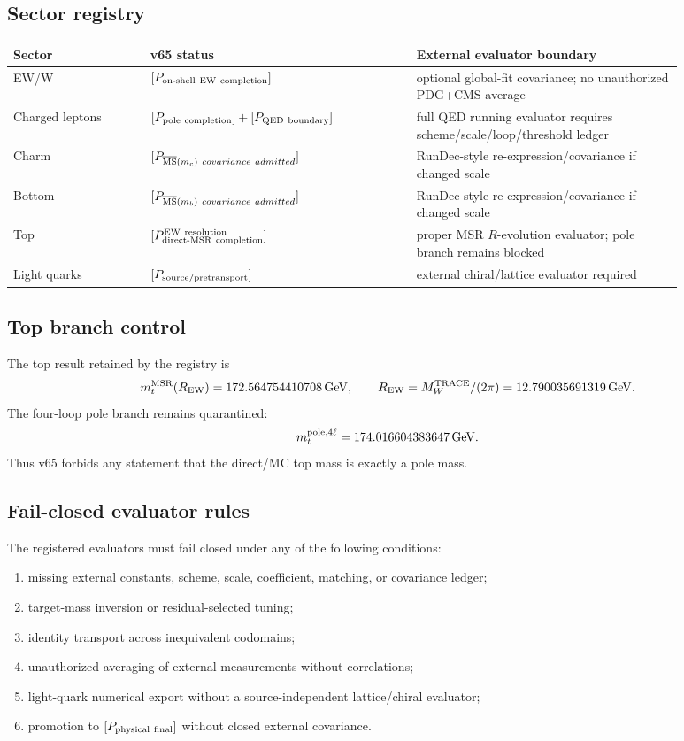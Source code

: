 \subsection{Sector registry}
\begin{center}
\begin{tabular}{p{0.18\linewidth}p{0.35\linewidth}p{0.35\linewidth}}
\hline
Sector & v65 status & External evaluator boundary\\
\hline
EW/W & $[P_{\rm on\text{-}shell\ EW\ completion}]$ & optional global-fit covariance; no unauthorized PDG+CMS average\\
Charged leptons & $[P_{\rm pole\ completion}]+[P_{\rm QED\ boundary}]$ & full QED running evaluator requires scheme/scale/loop/threshold ledger\\
Charm & $[P_{\overline{\rm MS}(m_c)\ covariance\ admitted}]$ & RunDec-style re-expression/covariance if changed scale\\
Bottom & $[P_{\overline{\rm MS}(m_b)\ covariance\ admitted}]$ & RunDec-style re-expression/covariance if changed scale\\
Top & $[P_{\rm direct\text{-}MSR\ completion}^{\rm EW\ resolution}]$ & proper MSR $R$-evolution evaluator; pole branch remains blocked\\
Light quarks & $[P_{\rm source/pretransport}]$ & external chiral/lattice evaluator required\\
\hline
\end{tabular}
\end{center}

\subsection{Top branch control}
The top result retained by the registry is
\[
  m_t^{\rm MSR}(R_{\rm EW})=172.564754410708\,\mathrm{GeV},
  \qquad R_{\rm EW}=M_W^{\rm TRACE}/(2\pi)=12.790035691319\,\mathrm{GeV}.
\]
The four-loop pole branch remains quarantined:
\[
  m_t^{{\rm pole},4\ell}=174.016604383647\,\mathrm{GeV}.
\]
Thus v65 forbids any statement that the direct/MC top mass is exactly a pole mass.

\subsection{Fail-closed evaluator rules}
The registered evaluators must fail closed under any of the following conditions:
\begin{enumerate}
\item missing external constants, scheme, scale, coefficient, matching, or covariance ledger;
\item target-mass inversion or residual-selected tuning;
\item identity transport across inequivalent codomains;
\item unauthorized averaging of external measurements without correlations;
\item light-quark numerical export without a source-independent lattice/chiral evaluator;
\item promotion to $[P_{\rm physical\ final}]$ without closed external covariance.
\end{enumerate}

